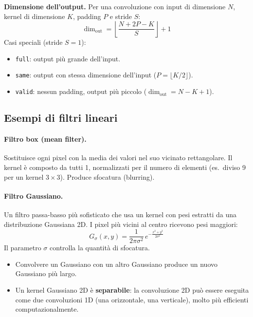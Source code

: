 \documentclass[12pt, a4paper]{report}
\begin{document}
\textbf{Dimensione dell'output.}
Per una convoluzione con input di dimensione $N$, kernel di dimensione $K$, padding
$P$ e stride $S$:
\[
  \dim_{\text{out}} = \left\lfloor\frac{N + 2P - K}{S}\right\rfloor + 1
\]
Casi speciali (stride $S=1$):
\begin{itemize}
  \item \texttt{full}: output più grande dell'input.
  \item \texttt{same}: output con stessa dimensione dell'input
        ($P = \lfloor K/2\rfloor$).
  \item \texttt{valid}: nessun padding, output più piccolo
        ($\dim_{\text{out}} = N - K + 1$).
\end{itemize}

\subsection{Esempi di filtri lineari}

\paragraph{Filtro box (mean filter).}
Sostituisce ogni pixel con la media dei valori nel suo vicinato rettangolare.  Il
kernel è composto da tutti 1, normalizzati per il numero di elementi (es.\ diviso 9
per un kernel $3\times3$).  Produce sfocatura (blurring).

\paragraph{Filtro Gaussiano.}
Un filtro passa-basso più sofisticato che usa un kernel con pesi estratti da una
distribuzione Gaussiana 2D.  I pixel più vicini al centro ricevono pesi maggiori:
\[
  G_\sigma(x,y) = \frac{1}{2\pi\sigma^2}\,e^{-\frac{x^2+y^2}{2\sigma^2}}
\]
Il parametro $\sigma$ controlla la quantità di sfocatura.

\begin{propbox}
\begin{itemize}
  \item Convolvere un Gaussiano con un altro Gaussiano produce un nuovo Gaussiano più
        largo.
  \item Un kernel Gaussiano 2D è \textbf{separabile}: la convoluzione 2D può essere
        eseguita come due convoluzioni 1D (una orizzontale, una verticale), molto più
        efficienti computazionalmente.
\end{itemize}
\end{propbox}
\end{document}
